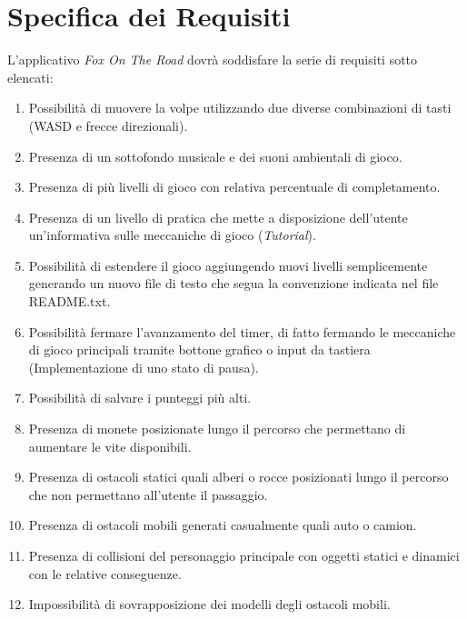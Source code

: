\documentclass[12pt,a4paper]{report}
\begin{document}
\chapter{Specifica dei Requisiti}\label{ch:spereq}

L'applicativo \emph{Fox On The Road} dovrà soddisfare la serie di requisiti sotto elencati:

\begin{enumerate}
  \item Possibilità di muovere la volpe utilizzando due diverse combinazioni di tasti (WASD e frecce direzionali).
  \item Presenza di un sottofondo musicale e dei suoni ambientali di gioco.
  \item Presenza di più livelli di gioco con relativa percentuale di completamento.
  \item Presenza di un livello di pratica che mette a disposizione dell'utente un'informativa sulle meccaniche di gioco (\emph{Tutorial}).
  \item Possibilità di estendere il gioco aggiungendo nuovi livelli semplicemente generando un nuovo file di testo che segua la convenzione indicata nel file README.txt.
  \item Possibilità fermare l'avanzamento del timer, di fatto fermando le meccaniche di gioco principali tramite bottone grafico o input da tastiera (Implementazione di uno stato di pausa).
  \item Possibilità di salvare i punteggi più alti.
  \item Presenza di monete posizionate lungo il percorso che permettano di aumentare le vite disponibili.
  \item Presenza di ostacoli statici quali alberi o rocce posizionati lungo il percorso che non permettano all'utente il passaggio.
  \item Presenza di ostacoli mobili generati casualmente quali auto o camion.
  \item Presenza di collisioni del personaggio principale con oggetti statici e dinamici con le relative conseguenze.
  \item Impossibilità di sovrapposizione dei modelli degli ostacoli mobili.

\end{enumerate}
\end{document}
